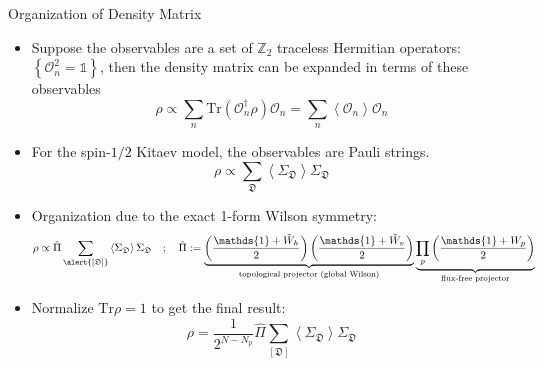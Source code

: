 \documentclass[professionalfont,
                xcolor=dvipsnames]{beamer}
\newcommand{\anglelr}[1]{\left\langle #1 \right\rangle}
\newcommand{\lr}[1]{\left(#1\right)}
\newcommand{\lrg}[1]{\left\{#1\right\}}
\newcommand{\mrm}[1]{\mathrm{#1}}
\newcommand{\tr}{\mrm{Tr}}
\begin{document}
\begin{frame}{Organization of Density Matrix}
    \begin{itemize}
        \item Suppose the observables are a set of $\mathbb{Z}_2$ traceless Hermitian operators: $\lrg{\mathcal{O}_n^2 = \mathds{1}}$, then the density matrix can be expanded in terms of these observables
        \[
        \rho \propto \sum_{n}\tr(\mathcal{O}_n^\dagger\rho)\mathcal{O}_n = \sum_{n}\anglelr{\mathcal{O}_n}\mathcal{O}_n
        \]
        \item For the spin-$1/2$ Kitaev model, the observables are Pauli strings.
        \[
        \rho \propto \sum_{\mathfrak{D}}\anglelr{\Sigma_\mathfrak{D}}\Sigma_{\mathfrak{D}}
        \]
        \item Organization due to the exact 1-form Wilson symmetry:
        \[
        \rho \propto \hat{\Pi} \sum_{\alert{[\mathfrak{D}]}}\anglelr{\Sigma_\mathfrak{D}}\Sigma_{\mathfrak{D}} \quad ; \quad 
        \hat{\Pi} := 
        \underbrace{
            \lr{\frac{\mathds{1} + \Tilde{W}_h}{2}} \lr{\frac{\mathds{1} + \Tilde{W}_v}{2}} 
        }_{\text{topological projector (global Wilson)}}
        \underbrace{
            \prod_{p}\lr{\frac{\mathds{1} + W_p}{2}}
        }_{\text{flux-free projector}}
        \]
        \item Normalize $\tr \rho = 1$ to get the final result:
        \[
        \boxed{
            \rho = \frac{1}{2^{N - N_p}}\hat{\Pi} \sum_{[\mathfrak{D}]}\anglelr{\Sigma_\mathfrak{D}}\Sigma_{\mathfrak{D}}
        }
        \]
    \end{itemize}
\end{frame}
\end{document}
